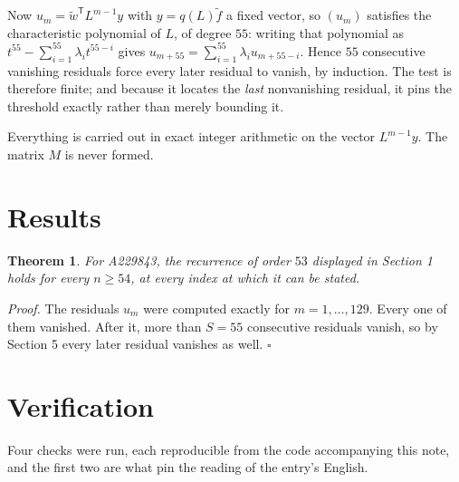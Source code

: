 \documentclass[11pt]{article}
\newtheorem{theorem}{Theorem}
\theoremstyle{definition}
\begin{document}
Now $u_m = \tilde w^{\mathsf T} L^{m-1} y$ with $y = q(L)\tilde f$ a fixed vector, so $(u_m)$ satisfies the characteristic polynomial of $L$, of degree $55$: writing that polynomial as $t^{55} - \sum_{i=1}^{55} \lambda_i t^{55-i}$ gives $u_{m+55} = \sum_{i=1}^{55} \lambda_i u_{m+55-i}$. Hence $55$ consecutive vanishing residuals force every later residual to vanish, by induction. The test is therefore finite; and because it locates the {\itshape last} nonvanishing residual, it pins the threshold exactly rather than merely bounding it.

Everything is carried out in exact integer arithmetic on the vector $L^{m-1}y$. The matrix $M$ is never formed.

\section{Results}

\begin{theorem} For A229843, the recurrence of order $53$ displayed in Section 1 holds for every $n \ge 54$, at every index at which it can be stated.\end{theorem}

{\itshape Proof.} The residuals $u_m$ were computed exactly for $m = 1,\dots,129$. Every one of them vanished. After it, more than $S = 55$ consecutive residuals vanish, so by Section 5 every later residual vanishes as well. $\square$

\section{Verification}

Four checks were run, each reproducible from the code accompanying this note, and the first two are what pin the reading of the entry's English.
\end{document}
